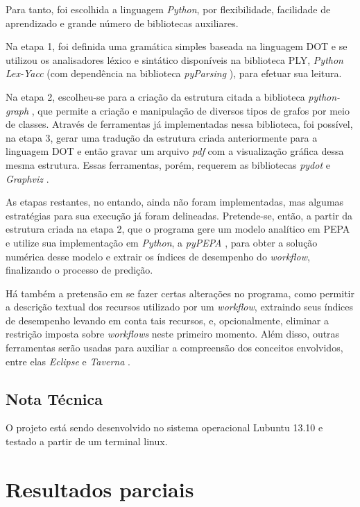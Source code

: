 \documentclass[a4paper,11pt]{article}
\begin{document}
  		Para tanto, foi escolhida a linguagem \emph{Python}, por flexibilidade, facilidade de aprendizado e grande número de bibliotecas auxiliares.

  		Na etapa 1, foi definida uma gramática simples baseada na linguagem DOT \cite{web:dot} e se utilizou os analisadores léxico e sintático disponíveis na biblioteca PLY, \emph{Python Lex-Yacc} \cite{web:ply} (com dependência na biblioteca \emph{pyParsing} \cite{web:pyparsing}), para efetuar sua leitura.

  		Na etapa 2, escolheu-se para a criação da estrutura citada a biblioteca \emph{python-graph} \cite{web:python-graph}, que permite a criação e manipulação de diversos tipos de grafos por meio de classes. Através de ferramentas já implementadas nessa biblioteca, foi possível, na etapa 3, gerar uma tradução da estrutura criada anteriormente para a linguagem DOT e então gravar um arquivo \emph{pdf} com a visualização gráfica dessa mesma estrutura. Essas ferramentas, porém, requerem as bibliotecas \emph{pydot} \cite{web:pydot} e \emph{Graphviz} \cite{web:graphviz}.

  		As etapas restantes, no entando, ainda não foram implementadas, mas algumas estratégias para sua execução já foram delineadas. Pretende-se, então, a partir da estrutura criada na etapa 2, que o programa gere um modelo analítico em PEPA e utilize sua implementação em \emph{Python}, a \emph{pyPEPA} \cite{web:pypepa}, para obter a solução numérica desse modelo e extrair os índices de desempenho do \emph{workflow}, finalizando o processo de predição. 

  		Há também a pretensão em se fazer certas alterações no programa, como permitir a descrição textual dos recursos utilizado por um \emph{workflow}, extraindo seus índices de desempenho levando em conta tais recursos, e, opcionalmente, eliminar a restrição imposta sobre \emph{workflows} neste primeiro momento. Além disso, outras ferramentas serão usadas para auxiliar a compreensão dos conceitos envolvidos, entre elas \emph{Eclipse} \cite{web:eclipse} e \emph{Taverna} \cite{web:taverna}.

	\subsection{Nota Técnica}

		O projeto está sendo desenvolvido no sistema operacional Lubuntu 13.10 e testado a partir de um terminal linux.


  \newpage
  \section{Resultados parciais}
\end{document}

